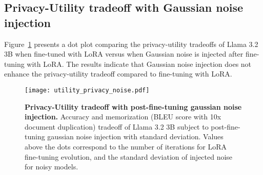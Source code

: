\subsection{Privacy-Utility tradeoff with Gaussian noise injection}
\label{sec:tradeoff_noise}

Figure~\ref{fig:tradeoff_noise} presents a dot plot comparing the privacy-utility tradeoffs of Llama 3.2 3B when fine-tuned with LoRA versus when Gaussian noise is injected after fine-tuning with LoRA. The results indicate that Gaussian noise injection does not enhance the privacy-utility tradeoff compared to fine-tuning with LoRA.

\begin{figure}[!htbp]

\begin{center}
\centerline{\texttt{[image: utility\_privacy\_noise.pdf]}}
\caption{\textbf{Privacy-Utility tradeoff with post-fine-tuning gaussian noise injection.} Accuracy and memorization (BLEU score with 10x document duplication) tradeoff of Llama 3.2 3B subject to post-fine-tuning gaussian noise injection with standard deviation. Values above the dots correspond to the number of iterations for LoRA fine-tuning evolution, and the standard deviation of injected noise for noisy models.}
\label{fig:tradeoff_noise}
\end{center}
\vskip -0.2in
\end{figure}